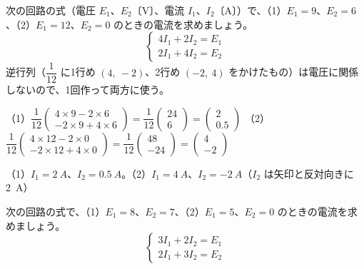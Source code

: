 \begin{reidai}
次の回路の式（電圧 $E_1$、$E_2$〔V〕、電流 $I_1$、$I_2$〔A〕）で、（1）$E_1=9$、$E_2=6$、（2）$E_1=12$、$E_2=0$ のときの電流を求めましょう。
\[ \begin{cases}4I_1+2I_2=E_1\\2I_1+4I_2=E_2\end{cases} \]
\kangaekata 逆行列（$\dfrac{1}{12}$ に1行め $(4,\ -2)$、2行め $(-2,\ 4)$ をかけたもの）は電圧に関係しないので、1回作って両方に使う。\par
\shiki（1）$\dfrac{1}{12}\begin{pmatrix}4\times9-2\times6\\-2\times9+4\times6\end{pmatrix}=\dfrac{1}{12}\begin{pmatrix}24\\6\end{pmatrix}=\begin{pmatrix}2\\0.5\end{pmatrix}$\kviifq
（2）$\dfrac{1}{12}\begin{pmatrix}4\times12-2\times0\\-2\times12+4\times0\end{pmatrix}=\dfrac{1}{12}\begin{pmatrix}48\\-24\end{pmatrix}=\begin{pmatrix}4\\-2\end{pmatrix}$\par
\kotae（1）\nobreak $I_1=\qty{2}{A}$、$I_2=\qty{0.5}{A}$。（2）\nobreak $I_1=\qty{4}{A}$、$I_2=\qty{-2}{A}$（$I_2$ は矢印と反対向きに \qty{2}{A}）
\end{reidai}

\begin{jibun}
次の回路の式で、（1）$E_1=8$、$E_2=7$、（2）$E_1=5$、$E_2=0$ のときの電流を求めましょう。
\[ \begin{cases}3I_1+2I_2=E_1\\2I_1+3I_2=E_2\end{cases} \]
\end{jibun}

